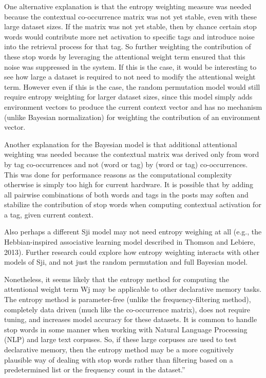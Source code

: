 \documentclass[answers,12pt]{exam}
\begin{document}
\begin{questions}
\begin{solution}
One alternative explanation is that the entropy weighting measure was needed because the contextual co-occurrence matrix was not yet stable, even with these large dataset sizes. If the matrix was not yet stable, then by chance certain stop words would contribute more net activation to specific tags and introduce noise into the retrieval process for that tag. So further weighting the contribution of these stop words by leveraging the attentional weight term ensured that this noise was suppressed in the system. If this is the case, it would be interesting to see how large a dataset is required to not need to modify the attentional weight term. However even if this is the case, the random permutation model would still require entropy weighting for larger dataset sizes, since this model simply adds environment vectors to produce the current context vector and has no mechanism (unlike Bayesian normalization) for weighting the contribution of an environment vector.

Another explanation for the Bayesian model is that additional attentional weighting was needed because the contextual matrix was derived only from word by tag co-occurrences and not (word or tag) by (word or tag) co-occurrences. This was done for performance reasons as the computational complexity otherwise is simply too high for current hardware. It is possible that by adding all pairwise combinations of both words and tags in the posts may soften and stabilize the contribution of stop words when computing contextual activation for a tag, given current context.

Also perhaps a different Sji model may not need entropy weighing at all (e.g., the Hebbian-inspired associative learning model described in Thomson and Lebiere, 2013). Further research could explore how entropy weighting interacts with other models of Sji, and not just the random permutation and full Bayesian model.

Nonetheless, it seems likely that the entropy method for computing the attentional weight term Wj may be applicable to other declarative memory tasks. The entropy method is parameter-free (unlike the frequency-filtering method), completely data driven (much like the co-occurrence matrix), does not require tuning, and increases model accuracy for these datasets. It is common to handle stop words in some manner when working with Natural Language Processing (NLP) and large text corpuses. So, if these large corpuses are used to test declarative memory, then the entropy method may be a more cognitively plausible way of dealing with stop words rather than filtering based on a predetermined list or the frequency count in the dataset.''


\end{solution}
\end{questions}
\end{document}
